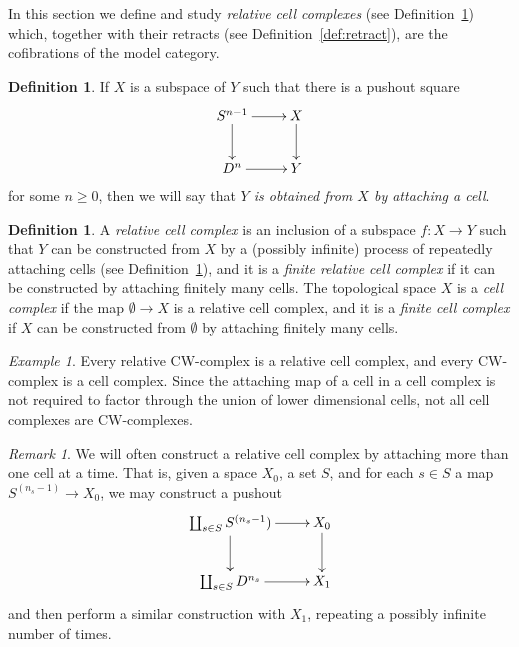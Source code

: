 \documentclass[12pt]{amsart}
\numberwithin{equation}{section}
\theoremstyle{slplain}
\theoremstyle{definition}
\newtheorem{defn}[equation]{Definition} %
\theoremstyle{remark}
\newtheorem{rem}[equation]{Remark}      %
\newtheorem{ex}[equation]{Example}      %
\newcommand{\defref}{Definition~\ref}
\begin{document}
In this section we define and study \emph{relative cell complexes}
(see \defref{def:CellComp}) which, together with their retracts (see
\defref{def:retract}), are the cofibrations of the model category.

\begin{defn}
  \label{def:AttCell}
  If $X$ is a subspace of $Y$ such that there is a pushout square
  \begin{displaymath}
    \xymatrix{
      {S^{n-1}} \ar[r] \ar[d]
      & {X} \ar[d]\\
      {D^{n}} \ar[r]
      & {Y}
    }
  \end{displaymath}
  for some $n \ge 0$, then we will say that \emph{$Y$ is obtained from
  $X$ by attaching a cell}.
\end{defn}


\begin{defn}
  \label{def:CellComp}
  A \emph{relative cell complex} is an inclusion of a subspace
  $f\colon X \to Y$ such that $Y$ can be constructed from $X$ by a
  (possibly infinite) process of repeatedly attaching cells (see
  \defref{def:AttCell}), and it is a \emph{finite relative cell
    complex} if it can be constructed by attaching finitely many
  cells.  The topological space $X$ is a \emph{cell complex} if the
  map $\emptyset \to X$ is a relative cell complex, and it is a
  \emph{finite cell complex} if $X$ can be constructed from
  $\emptyset$ by attaching finitely many cells.
\end{defn}


\begin{ex}
  \label{ex:CWcomp}
  Every relative CW-complex is a relative cell complex, and every
  CW-complex is a cell complex.  Since the attaching map of a cell in
  a cell complex is not required to factor through the union of lower
  dimensional cells, not all cell complexes are CW-complexes.
\end{ex}


\begin{rem}
  \label{rem:MultpleCells}
  We will often construct a relative cell complex by attaching more
  than one cell at a time.  That is, given a space $X_{0}$, a set $S$,
  and for each $s \in S$ a map $S^{(n_{s}-1)} \to X_{0}$, we may
  construct a pushout
  \begin{displaymath}
    \xymatrix{
      {\coprod_{s\in S} S^{(n_{s}-1})} \ar[r] \ar[d]
      & {X_{0}} \ar[d]\\
      {\coprod_{s\in S} D^{n_{s}}} \ar[r]
      & {X_{1}}
    }
  \end{displaymath}
  and then perform a similar construction with $X_{1}$, repeating a
  possibly infinite number of times.
\end{rem}
\end{document}
